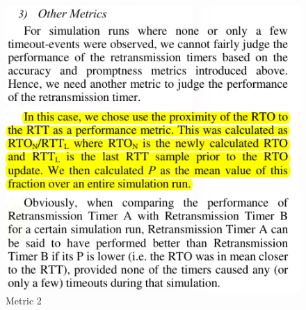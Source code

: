 \documentclass{article}[12pt]
\begin{document}
\begin{figure}[!h]
	\centering
	\includegraphics[width=.9\textwidth]{Pictures/algo/algo4.png}
	\caption{Metric 2}
\end{figure}
\end{document}

